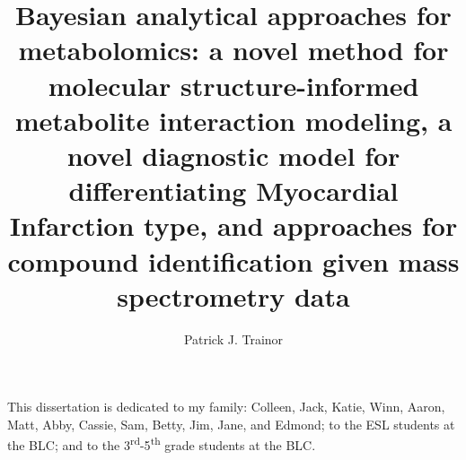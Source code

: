 \documentclass[final]{ulthesis}
\begin{document}
\author{Patrick J. Trainor}


\title{Bayesian analytical approaches for metabolomics: a novel method for molecular structure-informed metabolite interaction modeling, a novel diagnostic model for differentiating Myocardial Infarction type, and  approaches for compound identification given mass spectrometry data}









\frontmatter

\maketitle

\begin{dedication}
This dissertation is dedicated to my family: Colleen, Jack, Katie, Winn, Aaron, Matt, Abby, Cassie, Sam, Betty, Jim, Jane, and Edmond; to the ESL students at the BLC; and to the 3\textsuperscript{rd}-5\textsuperscript{th} grade students at the BLC.
\end{dedication}
\end{document}
